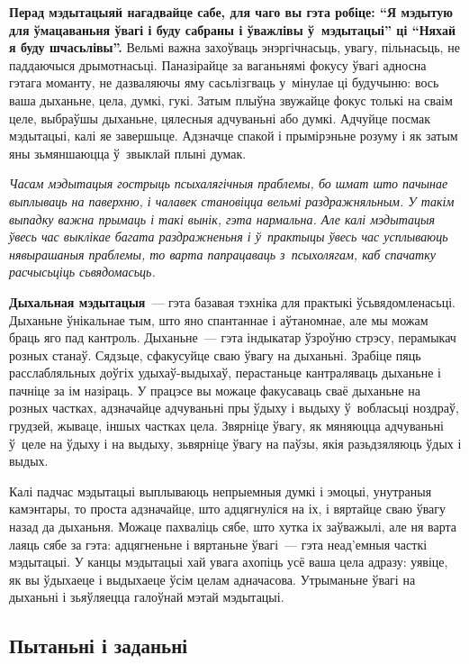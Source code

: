 \textbf{Перад мэдытацыяй нагадвайце сабе, для чаго вы гэта робіце: ``Я мэдытую для ўмацаваньня ўвагі і буду сабраны і ўважлівы ў~мэдытацыі'' ці ``Няхай я буду шчасьлівы''.} Вельмі важна захоўваць энэргічнасьць, увагу, пільнасьць, не паддаючыся дрымотнасьці. Паназірайце за ваганьнямі фокусу ўвагі адносна гэтага моманту, не дазваляючы яму сасьлізгваць у~мінулае ці будучыню: вось ваша дыханьне, цела, думкі, гукі. Затым плыўна звужайце фокус толькі на сваім целе, выбраўшы дыханьне, цялесныя адчуваньні або думкі. Адчуйце посмак мэдытацыі, калі яе завершыце. Адзначце спакой і прымірэньне розуму і як затым яны зьмяншаюцца ў~звыклай плыні думак.

\emph{Часам мэдытацыя гострыць псыхалягічныя праблемы, бо шмат што пачынае выплываць на паверхню, і чалавек становіцца вельмі раздражняльным. У такім выпадку важна прымаць і такі вынік, гэта нармальна. Але калі мэдытацыя ўвесь час выклікае багата раздражненьня і ў~практыцы ўвесь час усплываюць нявырашаныя праблемы, то варта папрацаваць з~псыхолягам, каб спачатку расчысьціць сьвядомасьць.}

\textbf{Дыхальная мэдытацыя}~--- гэта базавая тэхніка для практыкі ўсьвядомленасьці. Дыханьне ўнікальнае тым, што яно спантаннае і аўтаномнае, але мы можам браць яго пад кантроль. Дыханьне~--- гэта індыкатар ўзроўню стрэсу, перамыкач розных станаў. Сядзьце, сфакусуйце сваю ўвагу на дыханьні. Зрабіце пяць расслабляльных доўгіх удыхаў-выдыхаў, перастаньце кантраляваць дыханьне і пачніце за ім назіраць. У працэсе вы можаце факусаваць сваё дыханьне на розных частках, адзначайце адчуваньні пры ўдыху і выдыху ў~вобласьці ноздраў, грудзей, жываце, іншых частках цела. Звярніце ўвагу, як мяняюцца адчуваньні ў~целе на ўдыху і на выдыху, зьвярніце ўвагу на паўзы, якія разьдзяляюць ўдых і выдых.

Калі падчас мэдытацыі выплываюць непрыемныя думкі і эмоцыі, унутраныя камэнтары, то проста адзначайце, што адцягнуліся на іх, і вяртайце сваю ўвагу назад да дыханьня. Можаце пахваліць сябе, што хутка іх заўважылі, але ня варта лаяць сябе за гэта: адцягненьне і вяртаньне ўвагі~--- гэта неад'емныя часткі мэдытацыі. У канцы мэдытацыі хай увага ахопіць усё ваша цела адразу: уявіце, як вы ўдыхаеце і выдыхаеце ўсім целам адначасова. Утрыманьне ўвагі на дыханьні і зьяўляецца галоўнай мэтай мэдытацыі.

\subsection*{Пытаньні і заданьні}

